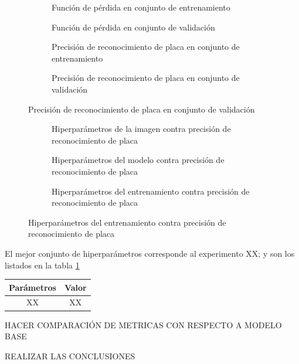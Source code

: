 \begin{figure}[H]
	\centering
	\begin{subfigure}[b]{0.45\textwidth}
		\caption{Función de pérdida en conjunto de entrenamiento}
	\end{subfigure}
	\hfill
	\begin{subfigure}[b]{0.45\textwidth}
		\caption{Función de pérdida en conjunto de validación}
	\end{subfigure}

	\begin{subfigure}[b]{0.45\textwidth}
		\caption{Precisión de reconocimiento de placa en conjunto de entrenamiento}
	\end{subfigure}
	\hfill
	\begin{subfigure}[b]{0.45\textwidth}
		\caption{Precisión de reconocimiento de placa en conjunto de validación}
	\end{subfigure}
\end{figure}

\begin{figure}[H]
	\begin{subfigure}[b]{\textwidth}
		\caption{Hiperparámetros de la imagen contra precisión de reconocimiento de placa}
	\end{subfigure}

	\begin{subfigure}[b]{\textwidth}
		\caption{Hiperparámetros del modelo contra precisión de reconocimiento de placa}
	\end{subfigure}
	
	\begin{subfigure}[b]{\textwidth}
		\caption{Hiperparámetros del entrenamiento contra precisión de reconocimiento de placa}
	\end{subfigure}
\end{figure}

El mejor conjunto de hiperparámetros corresponde al experimento XX; y son los listados en la 
tabla \ref{tab:mejor-hiperparametros}
\begin{table}[H]
	\begin{tabular}{| c | c |}
	\hline
		Parámetros & Valor \\
	\hline
		XX & XX \\
	\hline
	\end{tabular}
	\label{tab:mejor-hiperparametros}
\end{table}

HACER COMPARACIÓN DE METRICAS CON RESPECTO A MODELO BASE

REALIZAR LAS CONCLUSIONES
